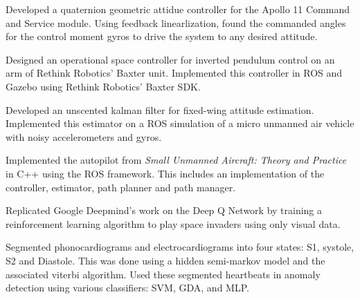 

\begin{cvparagraph}
Developed a quaternion geometric attidue controller for the Apollo 11 Command and Service module. Using feedback linearlization, found the commanded angles for the control moment gyros to drive the system to any desired attitude.
\end{cvparagraph}

\begin{cvparagraph}
Designed an operational space controller for inverted pendulum control on an arm of Rethink Robotics' Baxter unit. Implemented this controller in ROS and Gazebo using Rethink Robotics' Baxter SDK.
\end{cvparagraph}

\begin{cvparagraph}
Developed an unscented kalman filter for fixed-wing attitude estimation. Implemented this estimator on a ROS simulation of a micro unmanned air vehicle with noisy accelerometers and gyros.
\end{cvparagraph}

\begin{cvparagraph}
  Implemented the autopilot from \textit{Small Unmanned Aircraft: Theory and Practice} in C++ using the ROS framework. This includes an implementation of the controller, estimator, path planner and path manager.
\end{cvparagraph}

\begin{cvparagraph}
  Replicated Google Deepmind's work on the Deep Q Network by training a reinforcement learning algorithm to play space invaders using only visual data.
\end{cvparagraph}

\begin{cvparagraph}
  Segmented phonocardiograms and electrocardiograms into four states: S1, systole, S2 and Diastole. This was done using a hidden semi-markov model and the associated viterbi algorithm. Used these segmented heartbeats in anomaly detection using various classifiers: SVM, GDA, and MLP.
\end{cvparagraph}
